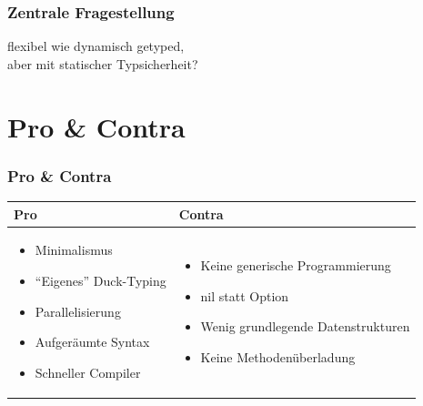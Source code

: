 \documentclass{beamer}
\begin{document}

\begin{frame}
\frametitle{Zentrale Fragestellung}

\centering
\glqq flexibel wie dynamisch getyped,\\ aber mit statischer Typsicherheit?\grqq{}

\end{frame}


\section{Pro \& Contra}
\begin{frame}
\frametitle{Pro \& Contra}

\begin{tabular}{p{5cm} | p{5.5cm}}
\textbf{Pro} & \textbf{Contra} \\ \hline
\begin{itemize}
\setlength{\itemsep}{20pt}
\item Minimalismus
\item ``Eigenes'' Duck-Typing
\item Parallelisierung
\item Aufger\"aumte Syntax
\item Schneller Compiler
\end{itemize}
&
\begin{itemize}
\setlength{\itemsep}{20pt}
\item Keine generische Programmierung
\item nil statt Option
\item Wenig grundlegende Datenstrukturen
\item Keine Methodenüberladung
\end{itemize}
\\
\end{tabular}

\end{frame}
\end{document}
